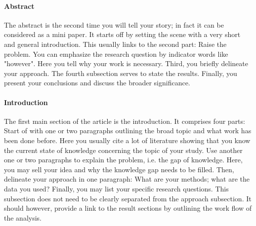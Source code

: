 \documentclass{tufte-book}
\begin{document}
\paragraph{Abstract}
The abstract %
is the second time you will tell your story; in fact it can be considered as a mini paper. It starts off by setting the scene with a very short and general introduction. This usually links to the second part: Raise the problem. You can emphasize the research question by indicator words like "however". Here you tell why your work is necessary. Third, you briefly delineate your approach. The fourth subsection serves to state the results. Finally, you present your conclusions and discuss the broader significance.\\

\paragraph{Introduction}
The first main section of the article is the introduction. %
It comprises four parts: Start of with one or two paragraphs outlining the broad topic and what work has been done before. Here you usually cite a lot of literature showing that you know the current state of knowledge concerning the topic of your study.
Use another one or two paragraphs to explain the problem, i.e. the gap of knowledge. Here, you may sell your idea and why the knowledge gap needs to be filled.
Then, delineate your approach in one paragraph: What are your methods; what are the data you used?
Finally, you may list your specific research questions. This subsection does not need to be clearly separated from the approach subsection. It should however, provide a link to the result sections by outlining the work flow of the analysis.\\

\end{document}
